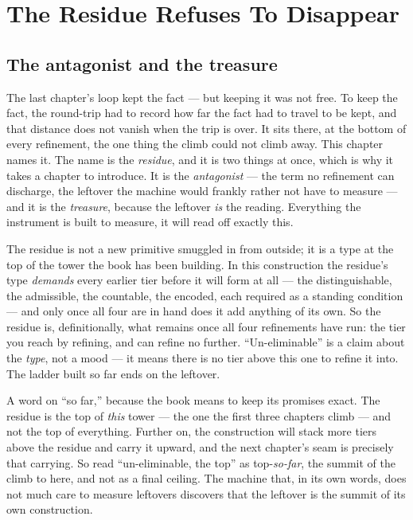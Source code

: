 \chapter{The Residue Refuses To Disappear}

\section{The antagonist and the treasure}

The last chapter's loop kept the fact --- but keeping it was not free. To keep the fact, the round-trip had to record
how far the fact had to travel to be kept, and that distance does not vanish when the trip is over. It sits there, at
the bottom of every refinement, the one thing the climb could not climb away. This chapter names it. The name is the
\emph{residue}, and it is two things at once, which is why it takes a chapter to introduce. It is the
\emph{antagonist} --- the term no refinement can discharge, the leftover the machine would frankly rather not have to
measure --- and it is the \emph{treasure}, because the leftover \emph{is} the reading. Everything the instrument is
built to measure, it will read off exactly this.

The residue is not a new primitive smuggled in from outside; it is a type at the top of the tower the book has been
building. In this construction the residue's type \emph{demands} every earlier tier before it will form at all --- the
distinguishable, the admissible, the countable, the encoded, each required as a standing condition --- and only once
all four are in hand does it add anything of its own. So the residue is, definitionally, what remains once all four
refinements have run: the tier you reach by refining, and can refine no further. ``Un-eliminable'' is a claim about
the \emph{type}, not a mood --- it means there is no tier above this one to refine it into. The ladder built so far
ends on the leftover.

A word on ``so far,'' because the book means to keep its promises exact. The residue is the top of \emph{this} tower
--- the one the first three chapters climb --- and not the top of everything. Further on, the construction will stack
more tiers above the residue and carry it upward, and the next chapter's seam is precisely that carrying. So read
``un-eliminable, the top'' as top-\emph{so-far}, the summit of the climb to here, and not as a final ceiling. The
machine that, in its own words, does not much care to measure leftovers discovers that the leftover is the summit of
its own construction.


